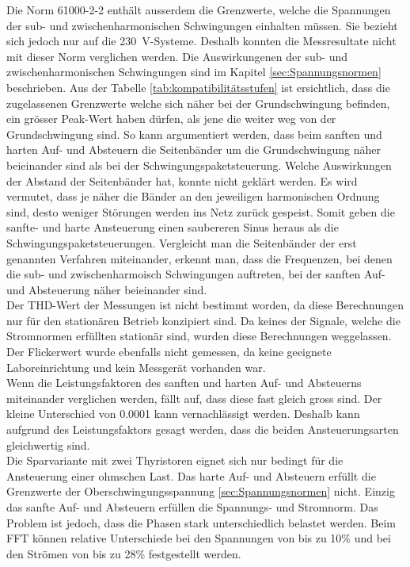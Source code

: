 Die Norm 61000-2-2 enthält ausserdem die Grenzwerte, welche die Spannungen der sub- und zwischenharmonischen Schwingungen einhalten müssen. Sie bezieht sich jedoch nur auf die \SI{230}{V}-Systeme. Deshalb konnten die Messresultate nicht mit dieser Norm verglichen werden. Die Auswirkungenen der sub- und zwischenharmonischen Schwingungen sind im Kapitel \ref{sec:Spannungsnormen} beschrieben. Aus der Tabelle \ref{tab:kompatibilitätsstufen} ist ersichtlich, dass die zugelassenen Grenzwerte welche sich näher bei der Grundschwingung befinden, ein grösser Peak-Wert haben dürfen, als jene die weiter weg von der Grundschwingung sind. So kann argumentiert werden, dass beim sanften und harten Auf- und Absteuern die Seitenbänder um die Grundschwingung näher beieinander sind als bei der Schwingungspaketsteuerung. Welche Auswirkungen der Abstand der Seitenbänder hat, konnte nicht geklärt werden. Es wird vermutet, dass je näher die Bänder an den jeweiligen harmonischen Ordnung sind, desto weniger Störungen werden ins Netz zurück gespeist. Somit geben die sanfte- und harte Ansteuerung einen saubereren Sinus heraus als die Schwingungspaketsteuerungen. Vergleicht man die Seitenbänder der erst genannten Verfahren miteinander, erkennt man, dass die Frequenzen, bei denen die sub- und zwischenharmoisch Schwingungen auftreten, bei der sanften Auf- und Absteuerung näher beieinander sind.\\

Der THD-Wert der Messungen ist nicht bestimmt worden, da diese Berechnungen nur für den stationären Betrieb konzipiert sind. Da keines der Signale, welche die Stromnormen erfüllten stationär sind, wurden diese Berechnungen weggelassen. Der Flickerwert wurde ebenfalls nicht gemessen, da keine geeignete Laboreinrichtung und kein Messgerät vorhanden war.\\

Wenn die Leistungsfaktoren des sanften und harten Auf- und Absteuerns miteinander verglichen werden, fällt auf, dass diese fast gleich gross sind. Der kleine Unterschied von 0.0001 kann vernachlässigt werden. Deshalb kann aufgrund des Leistungsfaktors gesagt werden, dass die beiden Ansteuerungsarten gleichwertig sind.\\

Die Sparvariante mit zwei Thyristoren eignet sich nur bedingt für die Ansteuerung einer ohmschen Last. Das harte Auf- und Absteuern erfüllt die Grenzwerte der Oberschwingungsspannung \ref{sec:Spannungsnormen} nicht. Einzig das sanfte Auf- und Absteuern erfüllen die Spannungs- und Stromnorm. Das Problem ist jedoch, dass die Phasen stark unterschiedlich belastet werden. Beim FFT können relative Unterschiede bei den Spannungen von bis zu 10\% und bei den Strömen von bis zu 28\% festgestellt werden.\\


